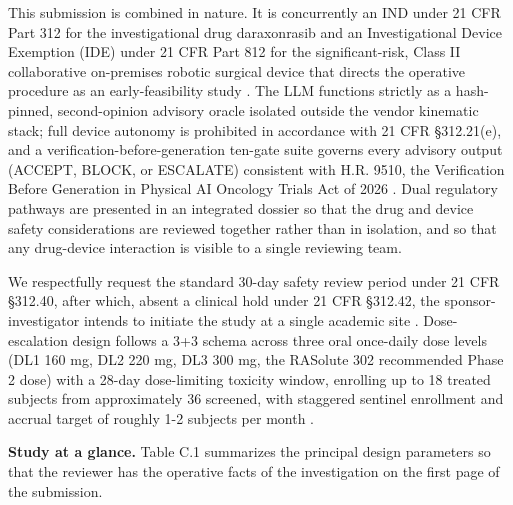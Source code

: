 This submission is combined in nature. It is concurrently an IND under 21 CFR Part 312 for the investigational drug daraxonrasib and an Investigational Device Exemption (IDE) under 21 CFR Part 812 for the significant-risk, Class II collaborative on-premises robotic surgical device that directs the operative procedure as an early-feasibility study \cite{onpremwhippl,paiautospons}. The LLM functions strictly as a hash-pinned, second-opinion advisory oracle isolated outside the vendor kinematic stack; full device autonomy is prohibited in accordance with 21 CFR \S 312.21(e), and a verification-before-generation ten-gate suite governs every advisory output (ACCEPT, BLOCK, or ESCALATE) consistent with H.R. 9510, the Verification Before Generation in Physical AI Oncology Trials Act of 2026 \cite{congress9510,clintrustpai}. Dual regulatory pathways are presented in an integrated dossier so that the drug and device safety considerations are reviewed together rather than in isolation, and so that any drug-device interaction is visible to a single reviewing team.

We respectfully request the standard 30-day safety review period under 21 CFR \S 312.40, after which, absent a clinical hold under 21 CFR \S 312.42, the sponsor-investigator intends to initiate the study at a single academic site \cite{phase1guidance}. Dose-escalation design follows a 3+3 schema across three oral once-daily dose levels (DL1 160 mg, DL2 220 mg, DL3 300 mg, the RASolute 302 recommended Phase 2 dose) with a 28-day dose-limiting toxicity window, enrolling up to 18 treated subjects from approximately 36 screened, with staggered sentinel enrollment and accrual target of roughly 1-2 subjects per month \cite{daraxwhipple}.

\noindent\textbf{Study at a glance.} Table C.1 summarizes the principal design parameters so that the reviewer has the operative facts of the investigation on the first page of the submission.


